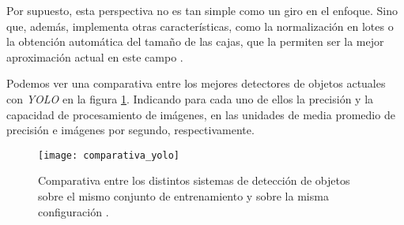 Por supuesto, esta perspectiva no es tan simple como un giro en el enfoque. Sino que, además, implementa otras características, como la normalización en lotes o la obtención automática del tamaño de las cajas, que la permiten ser la mejor aproximación actual en este campo \cite{yolov2}.

Podemos ver una comparativa entre los mejores detectores de objetos actuales con \textit{YOLO} en la figura \ref{fig:3.2.13}. Indicando para cada uno de ellos la precisión y la capacidad de procesamiento de imágenes, en las unidades de media promedio de precisión e imágenes por segundo, respectivamente.

\begin{figure}[h]
\centering
\texttt{[image: comparativa\_yolo]}
\caption{Comparativa entre los distintos sistemas de detección de objetos sobre el mismo conjunto de entrenamiento y sobre la misma configuración \cite{yolov2}.}
\label{fig:3.2.13}
\end{figure}


